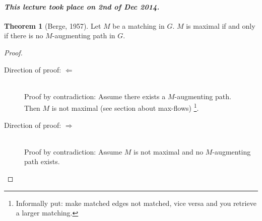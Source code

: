 \documentclass[a4paper]{article}
\theoremstyle{definition}
\newtheorem{theorem}{Theorem}
\newcommand{\dateref}[1]{\paragraph{\textit{This lecture took place on #1.}}}
\begin{document}
\dateref{2nd of Dec 2014}

\begin{theorem}[Berge, 1957]
  \label{satz-6.1}
  Let $M$ be a matching in $G$. $M$ is maximal if and only if there is no $M$-augmenting path in $G$.
\end{theorem}

\begin{proof}
  \begin{description}
    \item[Direction of proof: $\Leftarrow$] \hfill{} \\
      Proof by contradiction: Assume there exists a $M$-augmenting path. \\
      Then $M$ is not maximal (see section about max-flows)%
      \footnote{Informally put: make matched edges not matched, vice versa and you retrieve a larger matching.}.

    \item[Direction of proof: $\Rightarrow$] \hfill{} \\
      Proof by contradiction: Assume $M$ is not maximal and no $M$-augmenting path exists.


\end{description}
\end{proof}
\end{document}
